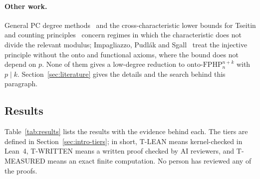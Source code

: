 \paragraph{Other work.}  General PC degree methods~\cite{miksa2015generalized} and the
cross-characteristic lower bounds for Tseitin and counting principles~\cite{bgip2001,alekhnovich2003nonbinomial,bikprs1996}
concern regimes in which the characteristic does not divide the relevant modulus;
Impagliazzo, Pudl\'ak and Sgall~\cite{ips1999} treat the injective principle without the
onto and functional axioms, where the bound does not depend on $p$.  None of them gives a
low-degree reduction to $\mathrm{onto\text{-}FPHP}^{n+k}_n$ with $p\mid k$.
Section~\ref{sec:literature} gives the details and the search behind this paragraph.

\subsection{Results}\label{sec:intro-results}

Table~\ref{tab:results} lists the results with the evidence behind each.
The tiers are defined in Section~\ref{sec:intro-tiers}; in short, T-LEAN means
kernel-checked in Lean~4, T-WRITTEN means a written proof checked by AI reviewers, and
T-MEASURED means an exact finite computation.  No person has reviewed any of the proofs.

